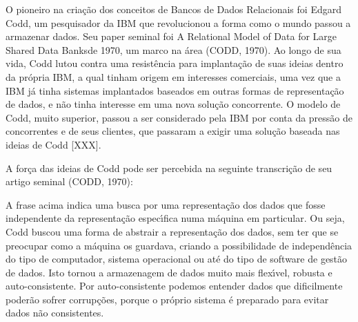 \documentclass[
12pt,		%
openright,	%
twoside,  %
a4paper,			%
chapter=TITLE,		%
english,			%
french,				%
spanish,			%
brazil				%
]{USPSC-classe/USPSC}
\begin{document}
O pioneiro na cria\c{c}\~ao dos conceitos de Bancos de Dados Relacionais foi Edgard Codd, um pesquisador da IBM que revolucionou a forma como o mundo passou a armazenar dados. Seu paper seminal foi  \textquotedbl A Relational Model of Data for Large Shared Data Banks\textquotedbl  de 1970, um marco na \'area (CODD, 1970). Ao longo de sua vida, Codd lutou contra uma resist\^encia para implanta\c{c}\~ao de suas ideias dentro da pr\'opria IBM, a qual tinham origem em interesses comerciais, uma vez que a IBM j\'a tinha sistemas implantados baseados em outras formas de representa\c{c}\~ao de dados, e n\~ao tinha interesse em uma nova solu\c{c}\~ao concorrente. O modelo de Codd, muito superior, passou a ser considerado pela IBM por conta da press\~ao de concorrentes e de seus clientes, que passaram a exigir uma solu\c{c}\~ao baseada nas ideias de Codd [XXX].


A for\c{c}a das ideias de Codd pode ser percebida na seguinte transcri\c{c}\~ao de seu artigo seminal (CODD, 1970):



\noindent\begin{center}\mbox{\centering{}}\end{center}


A frase acima indica uma busca por uma representa\c{c}\~ao dos dados que fosse independente da representa\c{c}\~ao espec\'{\i}fica numa m\'aquina em particular. Ou seja, Codd buscou uma forma de abstrair a representa\c{c}\~ao dos dados, sem ter que se preocupar como a m\'aquina os guardava, criando a possibilidade de independ\^encia do tipo de computador, sistema operacional ou at\'e do tipo de software de gest\~ao de dados. Isto tornou a armazenagem de dados muito mais flex\'{\i}vel, robusta e auto-consistente. Por auto-consistente podemos entender dados que dificilmente poder\~ao sofrer corrup\c{c}\~oes, porque o pr\'oprio sistema \'e preparado para evitar dados n\~ao consistentes.
\end{document}
